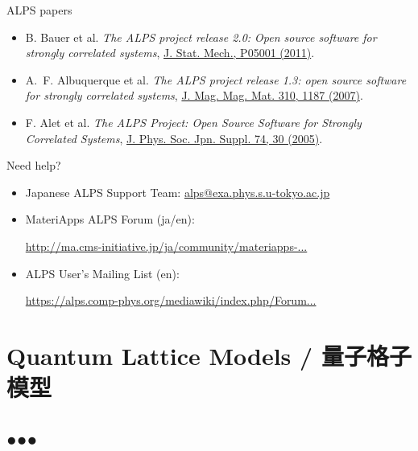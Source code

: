 \begin{frame}[t,fragile]{ALPS papers}
  \begin{itemize}
    \setlength{\itemsep}{1em}
  \item B. Bauer et al. {\it The ALPS project release 2.0: Open source software for strongly correlated systems}, \href{http://iopscience.iop.org/1742-5468/2011/05/P05001}{J. Stat. Mech., P05001 (2011)}.
  \item A.~F. Albuquerque et al. {\it The ALPS project release 1.3: open source software for strongly correlated systems}, \href{http://dx.doi.org/10.1016/j.jmmm.2006.10.304}{J. Mag. Mag. Mat. 310, 1187 (2007)}.
  \item F. Alet et al. {\it The ALPS Project: Open Source Software for
      Strongly Correlated Systems}, \href{http://jpsj.ipap.jp/link?JPSJS/74S/30}{J. Phys. Soc. Jpn. Suppl. 74, 30 (2005)}.
  \end{itemize}
\end{frame}

\begin{frame}[t,fragile]{Need help?}
  \begin{itemize}
    \setlength{\itemsep}{1em}
  \item Japanese ALPS Support Team: {\footnotesize \href{mailto:alps@exa.phys.s.u-tokyo.ac.jp}{alps@exa.phys.s.u-tokyo.ac.jp}}
  \item MateriApps ALPS Forum (ja/en):

    {\footnotesize \href{http://ma.cms-initiative.jp/ja/community/materiapps-messageboard/alps}{http://ma.cms-initiative.jp/ja/community/materiapps-...}}
  \item ALPS User's Mailing List (en):

    {\footnotesize \href{https://alps.comp-phys.org/mediawiki/index.php/Forum:Overview}{https://alps.comp-phys.org/mediawiki/index.php/Forum...}}
  \end{itemize}
\end{frame}

\section{Quantum Lattice Models / 量子格子模型}
\subsection*{{\protect\color{red}●}{\protect\color{blue}●}{\protect\color{green}●}}

